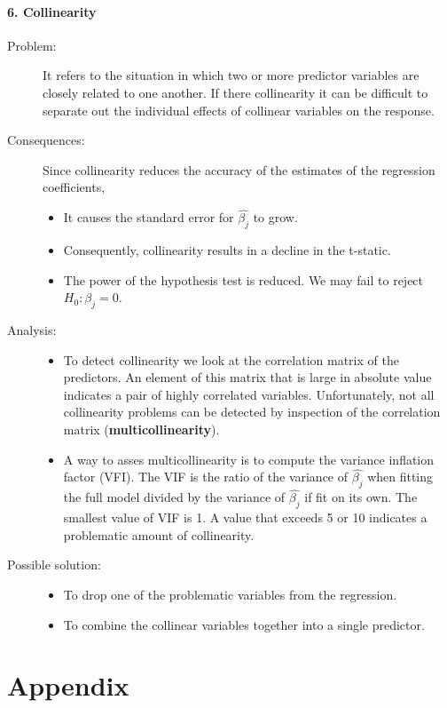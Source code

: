 \documentclass[a4paper]{article}
\begin{document}
						\paragraph{6. Collinearity}
						\begin{description}
							\item[Problem:] It refers to the situation in which two or more predictor variables are closely related to one another. If there collinearity it can be difficult to separate out the individual effects of collinear variables on the response.
							
							\item[Consequences:] Since collinearity reduces the accuracy of the estimates of the regression coefficients, 
								\begin{itemize}
									\item It causes the standard error for $\hat{\beta_j}$ to grow. 
									\item Consequently, collinearity results in a decline in the t-static.
									\item The power of the hypothesis test is reduced. We may fail to reject $H_0: \beta_j = 0$.
								\end{itemize}
							
							\item[Analysis:] \quad
							\begin{itemize}
								\item To detect collinearity we look at the correlation matrix of the predictors. An element of this matrix that is large in absolute value indicates a pair of highly correlated variables. Unfortunately, not all collinearity problems can be detected by inspection of the correlation matrix	 (\textbf{multicollinearity}).
								\item A way to asses multicollinearity is to compute the variance inflation factor (VFI). The VIF is the ratio of the variance of $\hat{\beta_j}$ when fitting the full model divided by the variance of $\hat{\beta_j}$ if fit on its own. The smallest value of VIF is 1. A value that exceeds 5 or 10 indicates a problematic amount of collinearity.
							\end{itemize}														
														
																
							\item[Possible solution:] \quad		
							\begin{itemize}
								\item To drop one of the problematic variables from the regression.
								\item To combine the collinear variables together into a single predictor.			
							\end{itemize}								
						
						\end{description}
				
		
		
	\section{Appendix}
	
		
\end{document}
